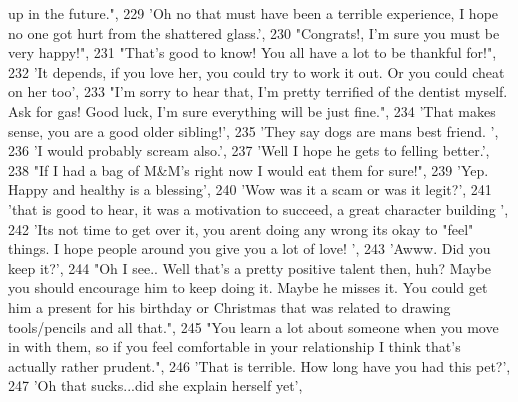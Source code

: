 \begin{DoxyCode}
{       up in the future."},
229                             \textcolor{stringliteral}{'Oh no that must have been a terrible experience, I hope no one got hurt from
       the shattered glass.'},
230                             \textcolor{stringliteral}{"Congrats!, I'm sure you must be very happy!"},
231                             \textcolor{stringliteral}{"That's good to know!  You all have a lot to be thankful for!"},
232                             \textcolor{stringliteral}{'It depends, if you love her, you could try to work it out.  Or you could cheat
       on her too'},
233                             \textcolor{stringliteral}{"I'm sorry to hear that, I'm pretty terrified of the dentist myself. Ask for
       gas! Good luck, I'm sure everything will be just fine."},
234                             \textcolor{stringliteral}{'That makes sense, you are a good older sibling!'},
235                             \textcolor{stringliteral}{'They say dogs are mans best friend. '},
236                             \textcolor{stringliteral}{'I would probably scream also.'},
237                             \textcolor{stringliteral}{'Well I hope he gets to felling better.'},
238                             \textcolor{stringliteral}{"If I had a bag of M&M's right now I would eat them for sure!"},
239                             \textcolor{stringliteral}{'Yep. Happy and healthy is a blessing'},
240                             \textcolor{stringliteral}{'Wow was it a scam or was it legit?'},
241                             \textcolor{stringliteral}{'that is good to hear, it was a motivation to succeed, a great character
       building '},
242                             \textcolor{stringliteral}{'Its not time to get over it, you arent doing any wrong its okay to "feel"
       things. I hope people around you give you a lot of love! '},
243                             \textcolor{stringliteral}{'Awww. Did you keep it?'},
244                             \textcolor{stringliteral}{"Oh I see.. Well that's a pretty positive talent then, huh? Maybe you should
       encourage him to keep doing it. Maybe he misses it. You could get him a present for his birthday or Christmas
       that was related to drawing tools/pencils and all that."},
245                             \textcolor{stringliteral}{"You learn a lot about someone when you move in with them, so if you feel
       comfortable in your relationship I think that's actually rather prudent."},
246                             \textcolor{stringliteral}{'That is terrible. How long have you had this pet?'},
247                             \textcolor{stringliteral}{'Oh that sucks...did she explain herself yet'},

\end{DoxyCode}
